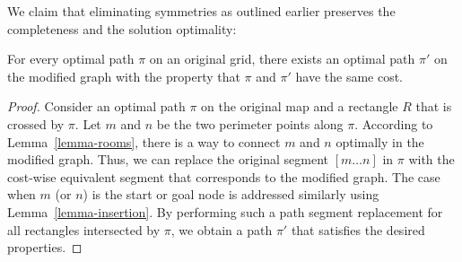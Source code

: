 We claim that eliminating symmetries as outlined earlier
preserves the completeness and the solution optimality:
\begin{theorem}
For every optimal path $\pi$ on an original grid, there exists an optimal path
$\pi'$ on the modified graph with the property that $\pi$ and $\pi'$ have the
same cost.
\end{theorem}
\begin{proof}
Consider an optimal path $\pi$ on the original map and a rectangle $R$ that is
crossed by $\pi$.  Let $m$ and $n$ be the two perimeter points along $\pi$.
According to Lemma~\ref{lemma-rooms}, there is a way to connect $m$ and $n$
optimally in the modified graph. Thus, we can replace the original segment $[m
\dots n]$ in $\pi$ with the cost-wise equivalent segment that corresponds to the
modified graph.  The case when $m$ (or $n$) is the start or goal node is
addressed similarly using Lemma~\ref{lemma-insertion}.  By performing such a
path segment replacement for all rectangles intersected by $\pi$, we obtain a
path $\pi'$ that satisfies the desired properties.
\end{proof}



